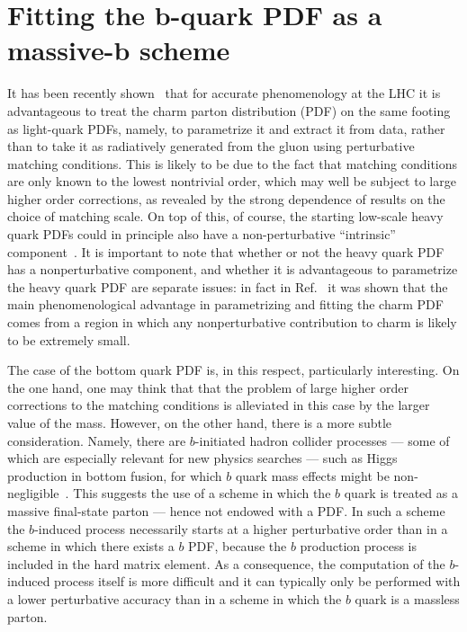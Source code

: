 \chapter{Fitting the b-quark PDF as a massive-b scheme}
\label{ch:bottom}

It has been recently shown~\cite{Ball:2017nwa} that for accurate
phenomenology at the LHC it is advantageous to treat the charm parton
distribution (PDF) on the same footing as light-quark PDFs, namely, to
parametrize it and extract it from data, rather than to take it
as radiatively generated from the gluon using  perturbative matching
conditions. This is likely to be
due to the fact that matching conditions are only known to
the lowest nontrivial order, which may well be subject to large higher
order
corrections, as revealed by the strong dependence of results on the
choice of matching scale. On top of this, of course,
the starting low-scale heavy quark
PDFs could in principle also have a
non-perturbative ``intrinsic''
component~\cite{Brodsky:1980pb,PhysRevD.23.2745}. It is important to note  that
whether or not the heavy quark PDF has a nonperturbative component,
and whether it is advantageous to parametrize the heavy quark PDF are
separate issues: in fact in Ref.~\cite{Ball:2017nwa} it was shown that
the main phenomenological
advantage in parametrizing and fitting the charm PDF comes from a region in
which any nonperturbative contribution to charm is likely to be
extremely small. 

The case of the bottom quark PDF is, in this respect, particularly
interesting. On the one hand, one may think that that the problem of
large higher order corrections to the matching conditions is alleviated
in this case by the larger value of the mass. However, on the other
hand, there is a more subtle consideration. Namely, there are $b$-initiated
hadron collider processes --- some of which
are especially relevant for new physics searches --- such as Higgs production in
bottom fusion, for which $b$ quark mass effects might be
non-negligible~\cite{Maltoni:2012pa,Lim:2016wjo,Bagnaschi:2018dnh}. This
suggests the use of a scheme in which the $b$ quark is
treated as a 
massive final-state parton --- hence not endowed with a
PDF. In such a scheme
the $b$-induced process necessarily
starts at a higher perturbative order than in  a scheme in which
there exists a $b$ PDF, because the $b$ production process is included in the
hard matrix element. As a consequence, the computation of the
$b$-induced process itself is more difficult and it can typically
only be performed with a lower perturbative accuracy than in a scheme
in which the $b$ quark is a massless parton.

